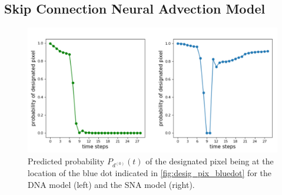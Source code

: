 \subsection{Skip Connection Neural Advection Model}

\begin{figure}[t]
        \centering
        \includegraphics[width=0.9\columnwidth]{images_sna/occlusionaware/probability_curves.pdf}
        \caption{Predicted probability $P_{d^{(0)}}(t)$ of the designated pixel being at the location of the blue dot indicated in \autoref{fig:desig_pix_bluedot} for the DNA model (left) and the SNA model (right).}        \label{fig:pix_reqppear_graph}
\end{figure}

